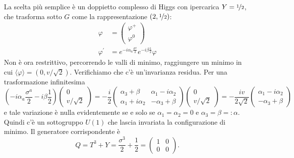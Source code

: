 \documentclass[italian,a4paper]{article}
\theoremstyle{definition}
\begin{document}
\begin{description}
    La scelta pi\`u semplice \`e un doppietto complesso di Higgs con
    ipercarica $Y = \nicefrac{1}{2}$, che trasforma sotto $G$ come la
    rappresentazione $(2, \nicefrac{1}{2})$:
    \begin{align*}
        \varphi &= 
        \begin{pmatrix}
            \varphi^+ \\
            \varphi^0
        \end{pmatrix}\\
        \varphi^\prime &= e^{-i \alpha_a \frac{\sigma^a}{2}}e^{-i\beta
        \frac{1}{2}}\varphi
    \end{align*}
    Non \`e ora restrittivo, percorrendo le valli di minimo, raggiungere un
    minimo in cui $\langle \varphi \rangle = (0, v/\sqrt{2})$. Verifichiamo
    che c'\`e un'invarianza residua. Per una trasformazione infinitesima
    \begin{equation*}
        (-i \alpha_a \dfrac{\sigma^a}{2} -i \beta \dfrac{1}{2})
        \begin{pmatrix}
            0 \\
            v/\sqrt{2}
        \end{pmatrix} = 
        -\dfrac{i}{2}
        \begin{pmatrix}
            \alpha_3 + \beta & \alpha_1 -i \alpha_2\\
            \alpha_1 + i \alpha_2 & -\alpha_3 + \beta
        \end{pmatrix}
        \begin{pmatrix}
            0\\
            v/\sqrt{2}
        \end{pmatrix}
        =
        -\dfrac{iv}{2\sqrt{2}}
        \begin{pmatrix}
            \alpha_1 - i \alpha_2\\
            -\alpha_3 + \beta
        \end{pmatrix}
    \end{equation*}
    e tale variazione \`e nulla evidentemente se e solo se $\alpha_1 =
    \alpha_2 = 0$ e $\alpha_3 = \beta =\mathop: \alpha$. Quindi c'\`e un
    sottogruppo $U(1)$ che lascia invariata la configurazione di minimo. Il
    generatore corrispondente \`e
    \begin{equation*}
        Q = T^3 + Y = \dfrac{\sigma^3}{2} + \dfrac{1}{2} = 
        \begin{pmatrix}
            1 & 0\\
            0 & 0
        \end{pmatrix}.
    \end{equation*}
\end{description}
\end{document}
